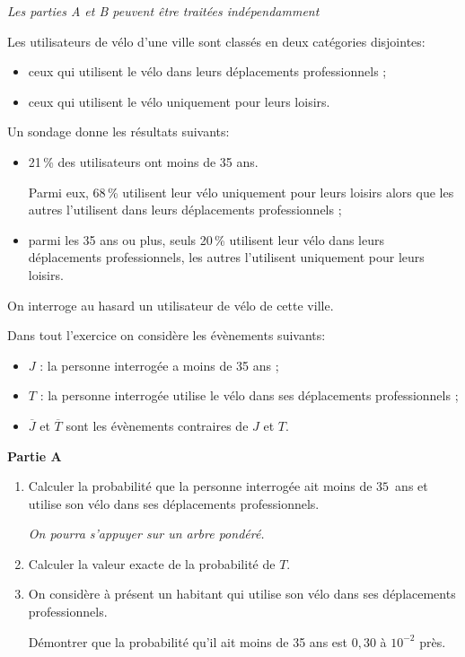 \medskip

\emph{Les parties {\rm A} et {\rm B} peuvent être traitées indépendamment}

\medskip

Les utilisateurs de vélo d'une ville sont classés en deux catégories disjointes:

\begin{itemize}
\item[$\bullet~~$]ceux qui utilisent le vélo dans leurs déplacements professionnels ;
\item[$\bullet~~$]ceux qui utilisent le vélo uniquement pour leurs loisirs.
\end{itemize}

\medskip

Un sondage donne les résultats suivants:

\begin{itemize}
\item[$\bullet~~$]21\,\% des utilisateurs ont moins de 35 ans.

Parmi eux, 68\,\% utilisent leur vélo uniquement pour leurs loisirs alors que les autres l'utilisent dans leurs déplacements professionnels ;
\item[$\bullet~~$]parmi les 35 ans ou plus, seuls 20\,\% utilisent leur vélo dans leurs déplacements professionnels, les autres l'utilisent uniquement pour leurs loisirs.
\end{itemize}

On interroge au hasard un utilisateur de vélo de cette ville.

Dans tout l'exercice on considère les évènements suivants:

\begin{itemize}
\item[$\bullet~~$]$J$ : \og la personne interrogée a moins de 35 ans \fg{} ;
\item[$\bullet~~$]$T$ : \og la personne interrogée utilise le vélo dans ses déplacements professionnels \fg{} ;
\item[$\bullet~~$]$\overline{J}$ et $\overline{T}$ sont les évènements contraires de $J$ et $T$.
\end{itemize}

\bigskip

\textbf{Partie A}

\medskip

\begin{enumerate}
\item Calculer la probabilité que la personne interrogée ait moins de $35$~ans et utilise son vélo dans ses déplacements professionnels.

\emph{On pourra s'appuyer sur un arbre pondéré.}
\item Calculer la valeur exacte de la probabilité de $T$.
\item On considère à présent un habitant qui utilise son vélo dans ses déplacements professionnels.

Démontrer que la probabilité qu'il ait moins de 35 ans est $0,30$ à $10^{-2}$ près.
\end{enumerate}

